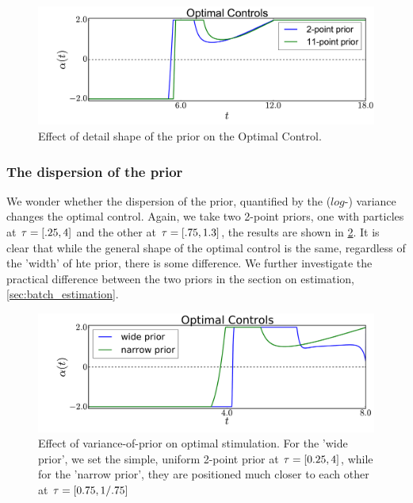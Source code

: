 \documentclass{article}
\begin{document}
\begin{figure}[htp]
\begin{center}
  \includegraphics[width=1\textwidth]{Figs/AdjointOptimizer/NumberOfTausEffect.pdf}
  \caption[labelInTOC]{Effect of detail shape of the prior on the Optimal
  Control. } 
  \label{fig:prior_shape_impact}
\end{center}
\end{figure}

\subsubsection{The dispersion of the prior}
We wonder whether the dispersion of the prior, quantified by the ($log$-)
variance changes the optimal control. Again, we take two 2-point priors, one with
particles at ${ \tau } = [.25, 4]$ and the other at ${ \tau } = [.75,1.3]$, the results
are shown in \cref{fig:prior_dispersion_impact}. It is clear that while the
general shape of the optimal control is the same, regardless of the 'width' of
hte prior, there is some difference. We further investigate the
practical difference between the two priors in the section on estimation,
\cref{sec:batch_estimation}.

\begin{figure}[htp]
\begin{center}
  \includegraphics[width=\textwidth]{Figs/AdjointOptimizer/PriorSpread.pdf}
  \caption[labelInTOC]{Effect of variance-of-prior on optimal stimulation.
  For the 'wide prior', we set the simple, uniform 2-point prior at
   ${ \tau } =  [0.25, 4]$, while for the 'narrow prior', they are positioned much
   closer to each other at ${ \tau } =   [0.75, 1/.75 ]$  }
  \label{fig:prior_dispersion_impact} 
\end{center}
\end{figure}
\end{document}
